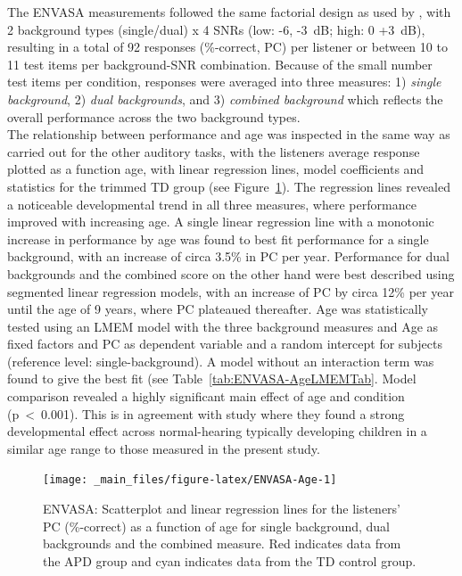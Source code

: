 \documentclass[a4paper, twoside]{templates/ociamthesis}
\begin{document}
The ENVASA measurements followed the same factorial design as used by \textcite{Leech2009}, with 2 background types (single/dual) x 4 SNRs (low: -6, -3~dB; high: 0 +3~dB), resulting in a total of 92 responses (\%-correct, PC) per listener or between 10 to 11 test items per background-SNR combination. Because of the small number test items per condition, responses were averaged into three measures: 1) \emph{single background}, 2) \emph{dual backgrounds}, and 3) \emph{combined background} which reflects the overall performance across the two background types.\\

The relationship between performance and age was inspected in the same way as carried out for the other auditory tasks, with the listeners average response plotted as a function age, with linear regression lines, model coefficients and statistics for the trimmed TD group (see Figure~\ref{fig:ENVASA-Age}). The regression lines revealed a noticeable developmental trend in all three measures, where performance improved with increasing age. A single linear regression line with a monotonic increase in performance by age was found to best fit performance for a single background, with an increase of circa 3.5\% in PC per year. Performance for dual backgrounds and the combined score on the other hand were best described using segmented linear regression models, with an increase of PC by circa 12\% per year until the age of 9 years, where PC plateaued thereafter. Age was statistically tested using an LMEM model with the three background measures and Age as fixed factors and PC as dependent variable and a random intercept for subjects (reference level: single-background). A model without an interaction term was found to give the best fit (see Table~\ref{tab:ENVASA-AgeLMEMTab}. Model comparison revealed a highly significant main effect of age and condition (p~\textless~0.001). This is in agreement with \textcite{Krishnan2013} study where they found a strong developmental effect across normal-hearing typically developing children in a similar age range to those measured in the present study.

\begin{figure}

{\centering \texttt{[image: \_main\_files/figure-latex/ENVASA-Age-1]} 

}

\caption{ENVASA: Scatterplot and linear regression lines for the listeners' PC (\%-correct) as a function of age for single background, dual backgrounds and the combined measure. Red indicates data from the APD group and cyan indicates data from the TD control group.}\label{fig:ENVASA-Age}
\end{figure}
\end{document}
